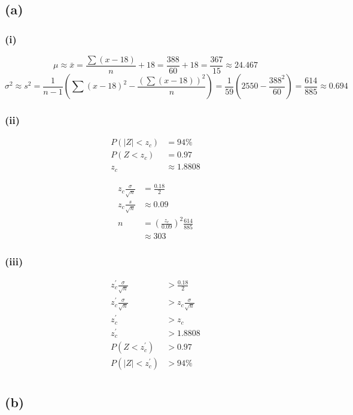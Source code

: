 \documentclass[a4paper]{article}
\begin{document}
\subsection*{(a)}
\subsubsection*{(i)}

\[\mu\approx\bar x=\frac{\sum(x-18)}n+18=\frac{388}{60}+18=\frac{367}{15}\approx\boxed{24.467}\]
\[\sigma^2\approx s^2=\frac1{n-1}\left(\sum(x-18)^2-\frac{\left(\sum(x-18)\right)^2}n\right)=\frac1{59}\left(2550-\frac{388^2}{60}\right)=\frac{614}{885}\approx\boxed{0.694}\]

\subsubsection*{(ii)}

\[\begin{aligned}
	P(|Z|<z_c)&=94\%\\
	P(Z<z_c)&=0.97\\
	z_c&\approx1.8808
\end{aligned}\]

\[\begin{aligned}
	z_c\frac{\sigma}{\sqrt n}&=\frac{0.18}2\\
	z_c\frac s{\sqrt n}&\approx0.09\\
	n&=\left(\frac{z_c}{0.09}\right)^2\frac{614}{885}\\
	 &\approx\boxed{303}
\end{aligned}\]

\subsubsection*{(iii)}

\[\begin{aligned}
	z_c^\prime\frac{\sigma}{\sqrt n}&>\frac{0.18}2\\
	z_c^\prime\frac{\sigma}{\sqrt n}&>z_c\frac{\sigma}{\sqrt n}\\
	z_c^\prime&>z_c\\
	z_c^\prime&>1.8808\\
	P(Z<z_c^\prime)&>0.97\\
	P(|Z|<z_c^\prime)&>94\%\\
\end{aligned}\]

\subsection*{(b)}
\end{document}
